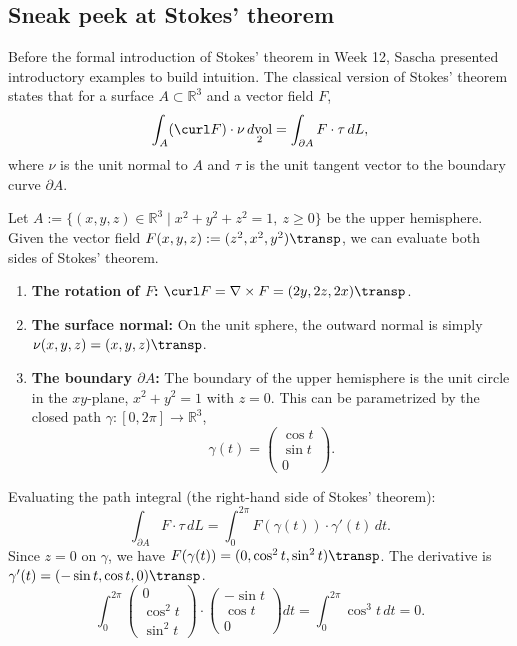 \subsection{Sneak peek at Stokes' theorem}
\label{sec:stokes_sneak_peek}

\begin{ainote}
Before the formal introduction of Stokes' theorem in Week 12, Sascha presented introductory examples to build intuition. The classical version of Stokes' theorem states that for a surface $A \subset \mathbb{R}^3$ and a vector field $F$,
\[\int_A (\curl F)\cdot \nu \mathop{d\text{vol}}_2 = \int_{\partial A} F \cdot \tau \,dL,\]
where $\nu$ is the unit normal to $A$ and $\tau$ is the unit tangent vector to the boundary curve $\partial A$.
\end{ainote}

\begin{example}
\label{ex:stokes_hemisphere}
Let $A := \{(x,y,z) \in \mathbb{R}^3 \mid x^2+y^2+z^2=1,\ z \geq 0\}$ be the upper hemisphere.
Given the vector field $F(x,y,z) := (z^2, x^2, y^2)\transp$, we can evaluate both sides of Stokes' theorem.
\begin{enumerate}[label=\textbf{\arabic*.}]
    \item \textbf{The rotation of $F$:} $\curl F = \nabla \times F = (2y, 2z, 2x)\transp$.
    \item \textbf{The surface normal:} On the unit sphere, the outward normal is simply $\nu(x,y,z) = (x,y,z)\transp$.
    \item \textbf{The boundary $\partial A$:} The boundary of the upper hemisphere is the unit circle in the $xy$-plane, $x^2+y^2=1$ with $z=0$. This can be parametrized by the closed path $\gamma : [0,2\pi] \to \mathbb{R}^3$,
    \[\gamma(t) = \begin{pmatrix} \cos t \\ \sin t \\ 0 \end{pmatrix}.\]
\end{enumerate}
Evaluating the path integral (the right-hand side of Stokes' theorem):
\[\int_{\partial A} F \cdot \tau \,dL = \int_0^{2\pi} F(\gamma(t)) \cdot \gamma'(t) \,dt.\]
Since $z=0$ on $\gamma$, we have $F(\gamma(t)) = (0, \cos^2 t, \sin^2 t)\transp$. The derivative is $\gamma'(t) = (-\sin t, \cos t, 0)\transp$.
\[\int_0^{2\pi} \begin{pmatrix} 0 \\ \cos^2 t \\ \sin^2 t \end{pmatrix} \cdot \begin{pmatrix} -\sin t \\ \cos t \\ 0 \end{pmatrix} dt = \int_0^{2\pi} \cos^3 t \,dt = 0.\]
\end{example}

